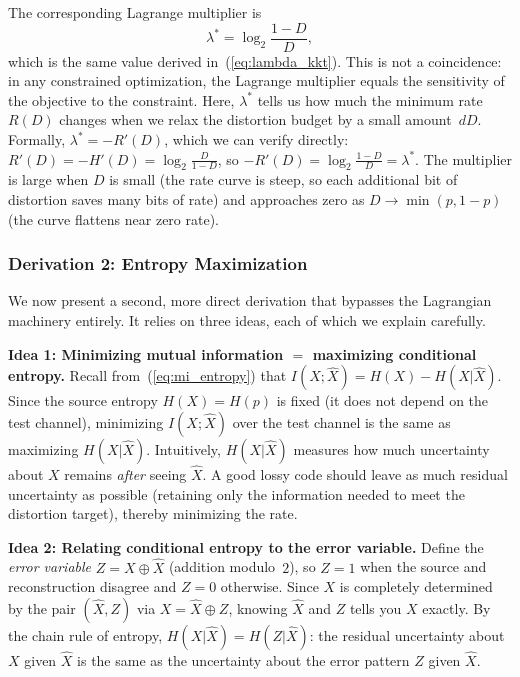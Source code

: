 \documentclass[11pt]{article}
\newcommand{\RD}{R(D)}
\begin{document}
The corresponding Lagrange multiplier is
\begin{equation}
\label{eq:lambda_star}
\lambda^* = \log_2 \frac{1-D}{D},
\end{equation}
which is the same value derived in~(\ref{eq:lambda_kkt}).
This is not a coincidence: in any constrained optimization, the Lagrange
multiplier equals the sensitivity of the objective to the constraint.
Here, $\lambda^*$ tells us how much the minimum rate $\RD$ changes when we relax
the distortion budget by a small amount~$dD$.
Formally, $\lambda^* = -R'(D)$, which we can verify directly:
$R'(D) = -H'(D) = \log_2\frac{D}{1-D}$,
so $-R'(D) = \log_2\frac{1-D}{D} = \lambda^*$.
The multiplier is large when $D$ is small (the rate curve is steep, so each
additional bit of distortion saves many bits of rate) and approaches zero as
$D \to \min(p,1-p)$ (the curve flattens near zero rate).

\subsubsection*{Derivation 2: Entropy Maximization}

We now present a second, more direct derivation that bypasses the Lagrangian
machinery entirely.
It relies on three ideas, each of which we explain carefully.

\smallskip
\noindent\textbf{Idea 1: Minimizing mutual information $=$ maximizing
conditional entropy.}
Recall from~(\ref{eq:mi_entropy}) that $I(X;\hat{X}) = H(X) - H(X|\hat{X})$.
Since the source entropy $H(X) = H(p)$ is fixed (it does not depend on the
test channel), minimizing $I(X;\hat{X})$ over the test channel is the same as
maximizing $H(X|\hat{X})$.
Intuitively, $H(X|\hat{X})$ measures how much uncertainty about $X$ remains
\emph{after} seeing $\hat{X}$.
A good lossy code should leave as much residual uncertainty as possible
(retaining only the information needed to meet the distortion target), thereby
minimizing the rate.

\smallskip
\noindent\textbf{Idea 2: Relating conditional entropy to the error variable.}
Define the \emph{error variable} $Z = X \oplus \hat{X}$ (addition modulo~$2$),
so $Z = 1$ when the source and reconstruction disagree and $Z = 0$ otherwise.
Since $X$ is completely determined by the pair $(\hat{X}, Z)$ via $X = \hat{X}
\oplus Z$, knowing $\hat{X}$ and $Z$ tells you $X$ exactly.
By the chain rule of entropy, $H(X|\hat{X}) = H(Z|\hat{X})$:
the residual uncertainty about $X$ given $\hat{X}$ is the same as the
uncertainty about the error pattern $Z$ given $\hat{X}$.
\end{document}
